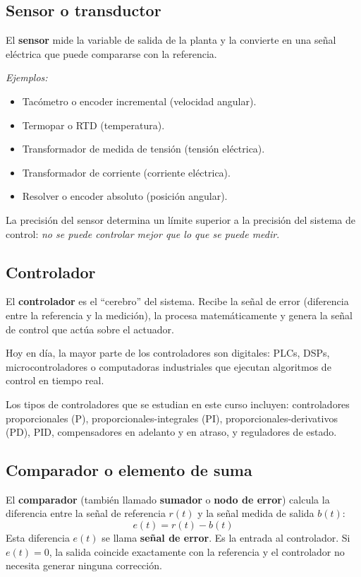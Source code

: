 \subsection{Sensor o transductor}

El \textbf{sensor} mide la variable de salida de la planta y la convierte en
una señal eléctrica que puede compararse con la referencia.

\textit{Ejemplos:}
\begin{itemize}
  \item Tacómetro o encoder incremental (velocidad angular).
  \item Termopar o RTD (temperatura).
  \item Transformador de medida de tensión (tensión eléctrica).
  \item Transformador de corriente (corriente eléctrica).
  \item Resolver o encoder absoluto (posición angular).
\end{itemize}

La precisión del sensor determina un límite superior a la precisión del
sistema de control: \textit{no se puede controlar mejor que lo que se puede medir}.

\subsection{Controlador}

El \textbf{controlador} es el ``cerebro'' del sistema. Recibe la señal de error
(diferencia entre la referencia y la medición), la procesa matemáticamente y
genera la señal de control que actúa sobre el actuador.

Hoy en día, la mayor parte de los controladores son digitales: PLCs, DSPs,
microcontroladores o computadoras industriales que ejecutan algoritmos de
control en tiempo real.

Los tipos de controladores que se estudian en este curso incluyen:
controladores proporcionales (P), proporcionales-integrales (PI),
proporcionales-derivativos (PD), PID, compensadores en adelanto y en
atraso, y reguladores de estado.

\subsection{Comparador o elemento de suma}

El \textbf{comparador} (también llamado \textbf{sumador} o \textbf{nodo de
error}) calcula la diferencia entre la señal de referencia $r(t)$ y la señal
medida de salida $b(t)$:
\begin{equation}
  e(t) = r(t) - b(t)
  \label{eq:error}
\end{equation}
Esta diferencia $e(t)$ se llama \textbf{señal de error}. Es la entrada al
controlador. Si $e(t) = 0$, la salida coincide exactamente con la referencia
y el controlador no necesita generar ninguna corrección.

